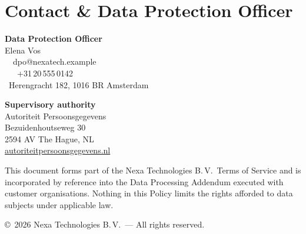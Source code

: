\documentclass[11pt,a4paper]{scrartcl}
\begin{document}
\section{Contact \& Data Protection Officer}

\begin{dpobox}
\begin{minipage}[t]{0.55\linewidth}
{\color{white}\bfseries\large Data Protection Officer}\\[4pt]
{\color{paleteal}Elena Vos}\\
{\color{white}\small
\faEnvelope\ \ dpo@nexatech.example\\
\faPhone\ \ \ +31\,20\,555\,0142\\
\faMapMarker\ Herengracht 182, 1016 BR Amsterdam
}
\end{minipage}
\hfill
\begin{minipage}[t]{0.4\linewidth}
{\color{white}\bfseries Supervisory authority}\\[4pt]
{\color{paleteal}\small
Autoriteit Persoonsgegevens\\
Bezuidenhoutseweg 30\\
2594 AV The Hague, NL\\
\url{autoriteitpersoonsgegevens.nl}
}
\end{minipage}
\end{dpobox}

\vspace{10pt}
{\small\color{slate}
This document forms part of the Nexa Technologies B.\,V.\ Terms of Service and is incorporated
by reference into the Data Processing Addendum executed with customer organisations. Nothing in
this Policy limits the rights afforded to data subjects under applicable law.
\par\vspace{4pt}
\copyright\ 2026 Nexa Technologies B.\,V.\ --- All rights reserved.}
\end{document}
